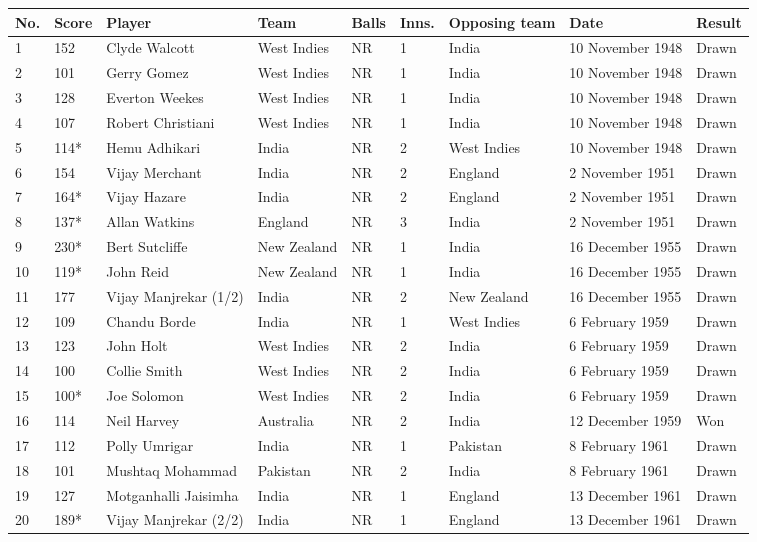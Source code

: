 \documentclass{article}
\begin{document}
\begin{tabular}{lllllllll}
\toprule
No. & Score & Player & Team & Balls & Inns. & Opposing team & Date & Result \\
\midrule
1 & 152 & Clyde Walcott & West Indies & NR & 1 & India & 10 November 1948 & Drawn \\
2 & 101 & Gerry Gomez & West Indies & NR & 1 & India & 10 November 1948 & Drawn \\
3 & 128 & Everton Weekes & West Indies & NR & 1 & India & 10 November 1948 & Drawn \\
4 & 107 & Robert Christiani & West Indies & NR & 1 & India & 10 November 1948 & Drawn \\
5 & 114* & Hemu Adhikari & India & NR & 2 & West Indies & 10 November 1948 & Drawn \\
6 & 154 & Vijay Merchant & India & NR & 2 & England & 2 November 1951 & Drawn \\
7 & 164* & Vijay Hazare & India & NR & 2 & England & 2 November 1951 & Drawn \\
8 & 137* & Allan Watkins & England & NR & 3 & India & 2 November 1951 & Drawn \\
9 & 230* & Bert Sutcliffe & New Zealand & NR & 1 & India & 16 December 1955 & Drawn \\
10 & 119* & John Reid & New Zealand & NR & 1 & India & 16 December 1955 & Drawn \\
11 & 177 & Vijay Manjrekar (1/2) & India & NR & 2 & New Zealand & 16 December 1955 & Drawn \\
12 & 109 & Chandu Borde & India & NR & 1 & West Indies & 6 February 1959 & Drawn \\
13 & 123 & John Holt & West Indies & NR & 2 & India & 6 February 1959 & Drawn \\
14 & 100 & Collie Smith & West Indies & NR & 2 & India & 6 February 1959 & Drawn \\
15 & 100* & Joe Solomon & West Indies & NR & 2 & India & 6 February 1959 & Drawn \\
16 & 114 & Neil Harvey & Australia & NR & 2 & India & 12 December 1959 & Won \\
17 & 112 & Polly Umrigar & India & NR & 1 & Pakistan & 8 February 1961 & Drawn \\
18 & 101 & Mushtaq Mohammad & Pakistan & NR & 2 & India & 8 February 1961 & Drawn \\
19 & 127 & Motganhalli Jaisimha & India & NR & 1 & England & 13 December 1961 & Drawn \\
20 & 189* & Vijay Manjrekar (2/2) & India & NR & 1 & England & 13 December 1961 & Drawn \\

\end{tabular}
\end{document}

